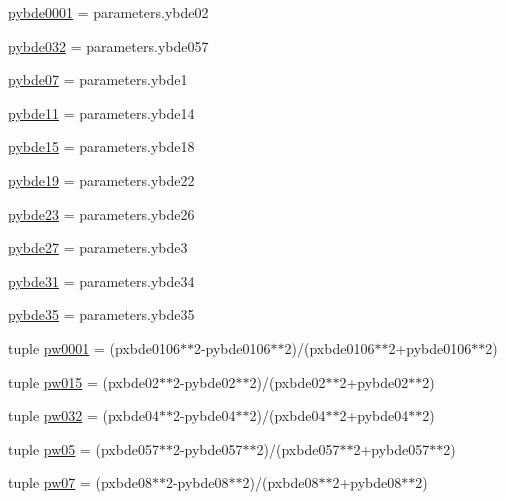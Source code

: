 \begin{DoxyCompactItemize}
\item 
\mbox{\hyperlink{namespacewBDE_a93e47fea41c418ee250643a17c1bb16c}{pybde0001}} = parameters.\+ybde02
\item 
\mbox{\hyperlink{namespacewBDE_aa74385387afba052089a09c555f258c4}{pybde032}} = parameters.\+ybde057
\item 
\mbox{\hyperlink{namespacewBDE_a7380a79cbb96de786d0359e7f2c7e85e}{pybde07}} = parameters.\+ybde1
\item 
\mbox{\hyperlink{namespacewBDE_a53296b34c799e938bf0cb63b81477f21}{pybde11}} = parameters.\+ybde14
\item 
\mbox{\hyperlink{namespacewBDE_a2c414d8306edd9f17cead6182f2c621c}{pybde15}} = parameters.\+ybde18
\item 
\mbox{\hyperlink{namespacewBDE_a816cfb2286df118d5facb027fdb4279a}{pybde19}} = parameters.\+ybde22
\item 
\mbox{\hyperlink{namespacewBDE_a9f24c446b1c63a46a8de2404ee18e939}{pybde23}} = parameters.\+ybde26
\item 
\mbox{\hyperlink{namespacewBDE_a01546beed61cd220d0f3c807bd16b408}{pybde27}} = parameters.\+ybde3
\item 
\mbox{\hyperlink{namespacewBDE_a8ca4e503b954e68c531f4fb4658fe070}{pybde31}} = parameters.\+ybde34
\item 
\mbox{\hyperlink{namespacewBDE_a37997e956a6d587ae1d2400ce7873da8}{pybde35}} = parameters.\+ybde35
\item 
tuple \mbox{\hyperlink{namespacewBDE_a50c38d5f47b93251e281da6299e87c60}{pw0001}} = (pxbde0106$\ast$$\ast$2-\/pybde0106$\ast$$\ast$2)/(pxbde0106$\ast$$\ast$2+pybde0106$\ast$$\ast$2)
\item 
tuple \mbox{\hyperlink{namespacewBDE_a7396bc96e7c4c2882cbe827958d956db}{pw015}} = (pxbde02$\ast$$\ast$2-\/pybde02$\ast$$\ast$2)/(pxbde02$\ast$$\ast$2+pybde02$\ast$$\ast$2)
\item 
tuple \mbox{\hyperlink{namespacewBDE_a3b7c6e6fe2c38a680372baca5289bd08}{pw032}} = (pxbde04$\ast$$\ast$2-\/pybde04$\ast$$\ast$2)/(pxbde04$\ast$$\ast$2+pybde04$\ast$$\ast$2)
\item 
tuple \mbox{\hyperlink{namespacewBDE_ab2d775042ac54c655767b2e1ba519dd8}{pw05}} = (pxbde057$\ast$$\ast$2-\/pybde057$\ast$$\ast$2)/(pxbde057$\ast$$\ast$2+pybde057$\ast$$\ast$2)
\item 
tuple \mbox{\hyperlink{namespacewBDE_a1dbabdbdbb809b0ad57dc8e37aadf349}{pw07}} = (pxbde08$\ast$$\ast$2-\/pybde08$\ast$$\ast$2)/(pxbde08$\ast$$\ast$2+pybde08$\ast$$\ast$2)
\item 

\end{DoxyCompactItemize}
